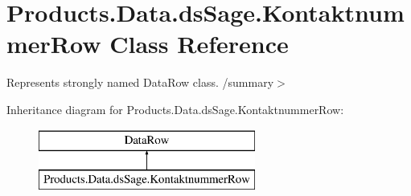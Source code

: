 \hypertarget{class_products_1_1_data_1_1ds_sage_1_1_kontaktnummer_row}{}\section{Products.\+Data.\+ds\+Sage.\+Kontaktnummer\+Row Class Reference}
\label{class_products_1_1_data_1_1ds_sage_1_1_kontaktnummer_row}


Represents strongly named Data\+Row class. /summary$>$  


Inheritance diagram for Products.\+Data.\+ds\+Sage.\+Kontaktnummer\+Row\+:\begin{figure}[H]
\begin{center}
\leavevmode
\includegraphics[height=2.000000cm]{class_products_1_1_data_1_1ds_sage_1_1_kontaktnummer_row}
\end{center}
\end{figure}

